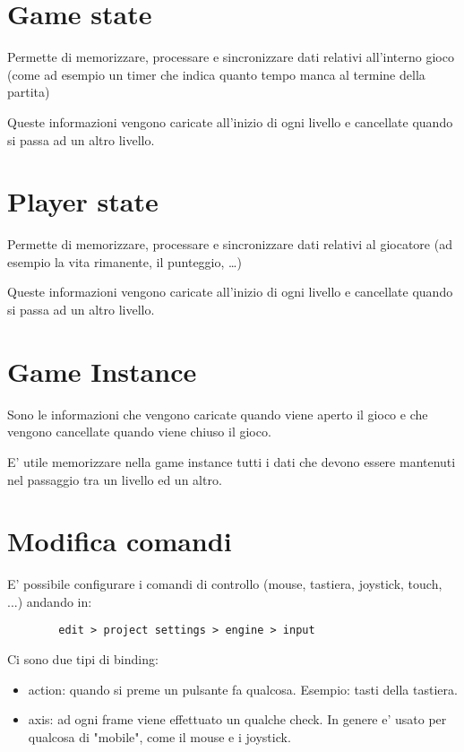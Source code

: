     \section{Game state}
        Permette di memorizzare, processare e sincronizzare dati relativi all'interno gioco (come ad esempio un timer che indica quanto tempo manca al termine della partita)

        Queste informazioni vengono caricate all'inizio di ogni livello e cancellate quando si passa ad un altro livello.


    \section{Player state}
        Permette di memorizzare, processare e sincronizzare dati relativi al giocatore (ad esempio la vita rimanente, il punteggio, \dots)

        Queste informazioni vengono caricate all'inizio di ogni livello e cancellate quando si passa ad un altro livello.


    \section{Game Instance}
        Sono le informazioni che vengono caricate quando viene aperto il gioco e che vengono cancellate quando viene chiuso il gioco.

        E' utile memorizzare nella game instance tutti i dati che devono essere mantenuti nel passaggio tra un livello ed un altro.


    \section{Modifica comandi}
        E' possibile configurare i comandi di controllo (mouse, tastiera, joystick, touch, ...) andando in:

        \begin{lstlisting}
        edit > project settings > engine > input
        \end{lstlisting}

        Ci sono due tipi di binding:
        \begin{itemize}
            \item action: quando si preme un pulsante fa qualcosa. Esempio: tasti della tastiera.
            \item axis: ad ogni frame viene effettuato un qualche check. In genere e' usato per qualcosa di "mobile", come il mouse e i joystick.
        \end{itemize}
